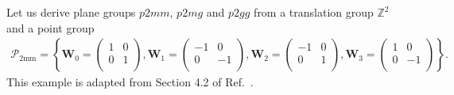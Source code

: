 Let us derive plane groups $p2mm$, $p2mg$ and $p2gg$ from a translation group $\mathbb{Z}^{2}$ and a point group
\begin{align*}
  \mathcal{P}_{\mathrm{2mm}} = \left\{
    \bm{W}_{0} = \begin{pmatrix}
      1 & 0 \\
      0 & 1 \\
    \end{pmatrix},
    \bm{W}_{1} = \begin{pmatrix}
      -1 & 0 \\
      0 & -1 \\
    \end{pmatrix},
    \bm{W}_{2} = \begin{pmatrix}
      -1 & 0 \\
      0 & 1 \\
    \end{pmatrix},
    \bm{W}_{3} = \begin{pmatrix}
      1 & 0 \\
      0 & -1 \\
    \end{pmatrix}
  \right\}.
\end{align*}
This example is adapted from Section 4.2 of Ref.~\cite{Souvignier08}.

